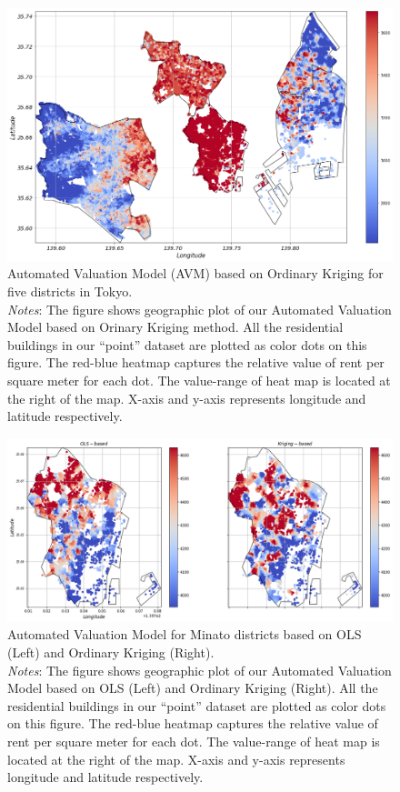 \documentclass[a4paper, 12pt]{article} %
\begin{document}
\newpage
\begin{landscape}
\begin{figure}
\centering
\includegraphics[scale=0.5]{kriging.png}
\caption{Automated Valuation Model (AVM) based on Ordinary Kriging for five districts in Tokyo. \\
\textit{Notes}: The figure shows geographic plot of our Automated Valuation Model based on Orinary Kriging method. All the residential buildings in our “point” dataset are plotted as color dots on this figure. The red-blue heatmap captures the relative value of rent per square meter for each dot. The value-range of heat map is located at the right of the map. X-axis and y-axis represents longitude and latitude respectively. 
} 
\label{fig7}
\end{figure}
\end{landscape}

\newpage
\begin{landscape}
\begin{figure}
\centering
\includegraphics[scale=0.5]{minato_compare.png}
\caption{Automated Valuation Model for Minato districts based on OLS (Left) and Ordinary Kriging (Right). \\
\textit{Notes}: The figure shows geographic plot of our Automated Valuation Model based on OLS (Left) and Ordinary Kriging (Right). All the residential buildings in our “point” dataset are plotted as color dots on this figure. The red-blue heatmap captures the relative value of rent per square meter for each dot. The value-range of heat map is located at the right of the map. X-axis and y-axis represents longitude and latitude respectively. }
\label{fig8}
\end{figure}
\end{landscape}




\clearpage


\end{document}
